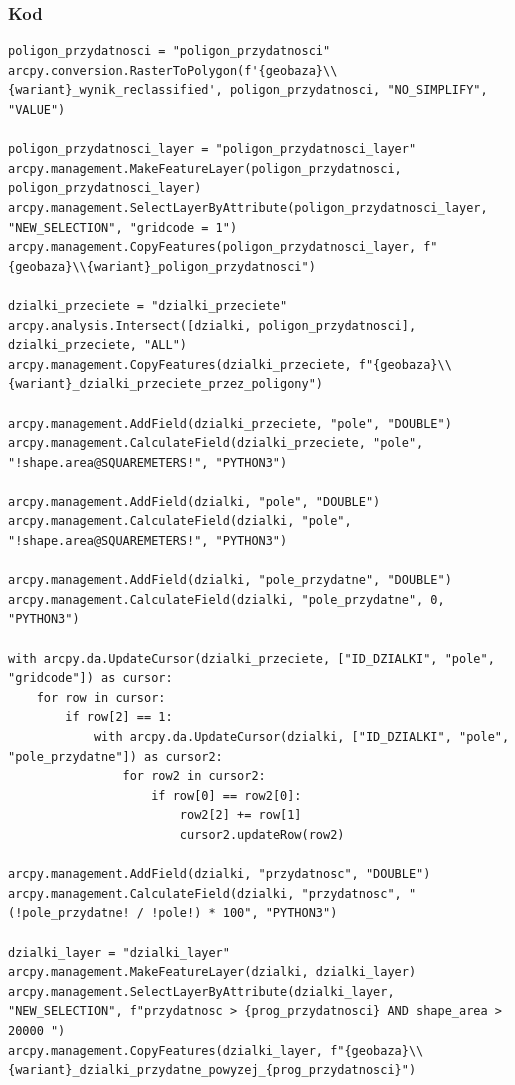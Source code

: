 \documentclass{article}
\begin{document}
\subsubsection{Kod}
\begin{lstlisting}
poligon_przydatnosci = "poligon_przydatnosci"
arcpy.conversion.RasterToPolygon(f'{geobaza}\\{wariant}_wynik_reclassified', poligon_przydatnosci, "NO_SIMPLIFY", "VALUE")

poligon_przydatnosci_layer = "poligon_przydatnosci_layer"
arcpy.management.MakeFeatureLayer(poligon_przydatnosci, poligon_przydatnosci_layer)
arcpy.management.SelectLayerByAttribute(poligon_przydatnosci_layer, "NEW_SELECTION", "gridcode = 1")
arcpy.management.CopyFeatures(poligon_przydatnosci_layer, f"{geobaza}\\{wariant}_poligon_przydatnosci")

dzialki_przeciete = "dzialki_przeciete"
arcpy.analysis.Intersect([dzialki, poligon_przydatnosci], dzialki_przeciete, "ALL")
arcpy.management.CopyFeatures(dzialki_przeciete, f"{geobaza}\\{wariant}_dzialki_przeciete_przez_poligony")

arcpy.management.AddField(dzialki_przeciete, "pole", "DOUBLE")
arcpy.management.CalculateField(dzialki_przeciete, "pole", "!shape.area@SQUAREMETERS!", "PYTHON3")

arcpy.management.AddField(dzialki, "pole", "DOUBLE")
arcpy.management.CalculateField(dzialki, "pole", "!shape.area@SQUAREMETERS!", "PYTHON3")

arcpy.management.AddField(dzialki, "pole_przydatne", "DOUBLE")
arcpy.management.CalculateField(dzialki, "pole_przydatne", 0, "PYTHON3")

with arcpy.da.UpdateCursor(dzialki_przeciete, ["ID_DZIALKI", "pole", "gridcode"]) as cursor:
    for row in cursor:
        if row[2] == 1:
            with arcpy.da.UpdateCursor(dzialki, ["ID_DZIALKI", "pole", "pole_przydatne"]) as cursor2:
                for row2 in cursor2:
                    if row[0] == row2[0]:
                        row2[2] += row[1]
                        cursor2.updateRow(row2)

arcpy.management.AddField(dzialki, "przydatnosc", "DOUBLE")
arcpy.management.CalculateField(dzialki, "przydatnosc", "(!pole_przydatne! / !pole!) * 100", "PYTHON3")

dzialki_layer = "dzialki_layer"
arcpy.management.MakeFeatureLayer(dzialki, dzialki_layer)
arcpy.management.SelectLayerByAttribute(dzialki_layer, "NEW_SELECTION", f"przydatnosc > {prog_przydatnosci} AND shape_area > 20000 ")
arcpy.management.CopyFeatures(dzialki_layer, f"{geobaza}\\{wariant}_dzialki_przydatne_powyzej_{prog_przydatnosci}")
\end{lstlisting}
\end{document}
